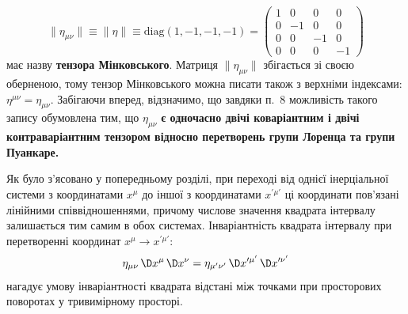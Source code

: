 \begin{equation}\label{eq:sinature}
  \|\eta_{\mu\nu}\| \equiv \|\eta\| \equiv \mathrm{diag}(1,-1,-1,-1) =
  \begin{pmatrix}
    1 & 0  & 0  & 0  \\
    0 & -1 & 0  & 0  \\
    0 & 0  & -1 & 0  \\
    0 & 0  & 0  & -1
  \end{pmatrix}
\end{equation}
має назву \textbf{тензора Мінковського}. Матриця $\|\eta_{\mu\nu}\|$ збігається зі своєю оберненою, тому тензор
Мінковського можна писати також з верхніми індексами: $\eta^{\mu\nu} = \eta_{\mu\nu}$. Забігаючи вперед, відзначимо, що
завдяки п.~8 можливість такого запису обумовлена тим, що $\eta_{\mu\nu}$ \textbf{є одночасно двічі коваріантним і двічі
контраваріантним тензором відносно перетворень групи Лоренца та групи Пуанкаре.}

Як було з'ясовано у попередньому розділі, при переході від однієї інерціальної системи з координатами $x^\mu$ до іншої з
координатами $x^{\prime\mu'}$ ці координати пов'язані лінійними співвідношеннями, причому числове значення квадрата
інтервалу залишається тим самим в обох системах. Інваріантність квадрата інтервалу при перетворенні координат $x^\mu \to
x^{\prime\mu'}$:
\begin{equation}\label{eq:2.1}
  \eta_{\mu\nu}\,\D x^\mu\,\D x^\nu
  = \eta_{\mu'\nu'}\,\D x^{\prime\mu'}\,\D x^{\prime\nu'}
\end{equation}
нагадує умову інваріантності квадрата відстані між точками при просторових поворотах у тривимірному просторі.


